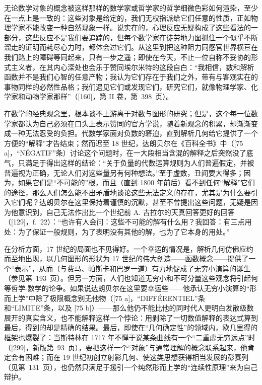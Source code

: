 无论数学对象的概念被这样那样的数学家或哲学家的哲学细微色彩如何渲染，至少在一点上是一致的：这些对象是给定的，我们无权指派给它们任意的性质，正如物理学家不能改变一种自然现象一样。说实在的，心理反应无疑构成了这些看法的一部分，这些反应不是我们要追踪的，但每个数学家在徒劳地力图抓住一个似乎不断溜走的证明而耗尽心力时，都体会过它们。从这里到把这种阻力同感官世界横亘在我们路上的障碍等同起来，只有一步之遥；即使在今天，不止一位自称不妥协的形式主义者，在其内心深处也会乐于赞同埃尔米特的这段自白：“我相信，数和解析函数并不是我们心智的任意产物；我认为它们存在于我们之外，带有与客观实在的事物同样的必然性品格；我们遇见它们或发现它们，研究它们，就像物理学家、化学家和动物学家那样”（{[}160{]}，第 II 卷，第~398~页）。

在数学的经典观念里，根本谈不上游离于对数与图形的研究；但是，这个每一位数学家都认为自己必须在口头上表示赞同的官方学说，随着新观念的积累，却渐渐变成一种无法忍受的负担。代数学家面对负数的窘迫，直到解析几何给它提供了一个方便的“解释”才告结束；然而迟至 18 世纪，达朗贝尔在《百科全书》中（{[}75 a{]}，“NÉGATIF”条）讨论这个问题时，在一大段相当含混的解释之后突然没了底气，只满足于得出这样的结论：“关于负量的代数运算规则为人们普遍假定，并被普遍视为正确，无论人们对这些量另有何种想法。”至于虚数，丑闻要大得多；因为，如果它们是“不可能的”根，而且（直到 1800 年前后）看不到任何“解释”它们的途径，那么人们怎么能不出矛盾地谈论这些无法定义的存在，尤其是为什么要引入它们呢？达朗贝尔在这里保持着谨慎的沉默，甚至不曾提出这些问题，无疑是因为他意识到，自己无法作出比一个世纪前 A. 吉拉尔的天真回答更好的回答（{[}129{]}，f.~22）：“也许有人会问：这些不可能的解有什么用？我回答：有三点用处：为了保证一般规则，为了表明没有其他的解，也为了它本身的用处。”

在分析方面，17 世纪的局面也不见得好。一个幸运的情况是，解析几何仿佛应约而至地出现，以几何图形的形状为 17 世纪的伟大创造——函数概念——提供了一个“表示”，从而（与费马、帕斯卡和巴罗一道）有力地促成了无穷小演算的诞生（参见第~193~页）。但另一方面，人们也知道无穷小和不可分量这些观念将引起何等哲学-数学的论争。如果说达朗贝尔在这里要幸运些——他承认无穷小演算的“形而上学”中除了极限概念别无他物（{[}75 a{]}，“DIFFÉRENTIEL”条和“LIMITE”条，以及 {[}75 b{]}）——那么他仍不能比他的同时代人更明白发散级数展开的真实含义，也不能解释这样一个悖论：用剥除了一切数值解释的表达式算到最后，得到的却是精确的结果。最后，即使在“几何确定性”的领域内，欧几里得的框架也爆裂了：当斯特林在 1717 年不惮于说某条曲线有一个“二重虚无穷远点”时（{[}299{]}，新版第~93~页），要把这样一个“对象”与通常理解的概念联系起来，他肯定会有困难；而在 19 世纪初创立射影几何、使这类思想获得相当发展的彭赛列（见第~131~页），也仍然只满足于援引一个纯然形而上学的“连续性原理”来为自己辩护。

